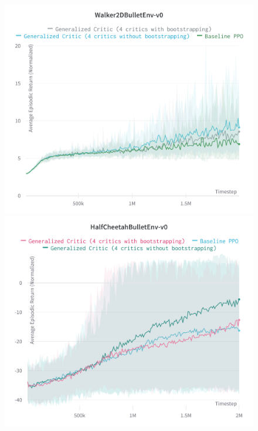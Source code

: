 \begin{figure}[!htb]

\begin{minipage}[b]{.5\linewidth}
  \centering
  \centerline{\includegraphics[width=\linewidth]{images/walker2D}}
\end{minipage}
\begin{minipage}[b]{.5\linewidth}
  \centering
  \centerline{\includegraphics[width=\linewidth]{images/halfcheetah}}
\end{minipage}


\end{figure}
